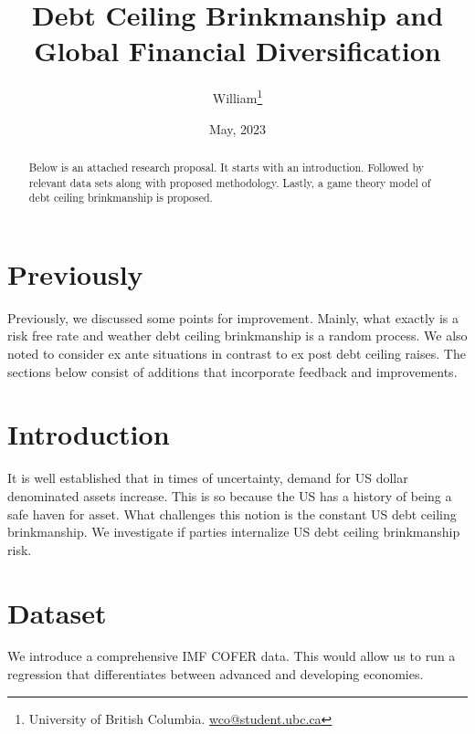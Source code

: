 \documentclass[12pt]{article}
\title{ \vspace*{-2.5cm} \hspace*{-0.5cm}Debt Ceiling Brinkmanship and Global Financial Diversification}
\author{William\thanks{University of British Columbia.
\href{mailto:TK@TK.edu}{wco@student.ubc.ca}}}
\date{ \vspace*{0.5cm} May, 2023\\
}
\begin{document}
\bgroup
\let\footnoterule\relax

\begin{singlespace}
\maketitle


\begin{abstract}
    \noindent Below is an attached research proposal. It starts with an introduction. Followed by relevant data sets along with proposed methodology. Lastly, a game theory model of debt ceiling brinkmanship is proposed. 
\end{abstract}
\end{singlespace}
\thispagestyle{empty}

\clearpage
\egroup
\setcounter{page}{1}


\section{Previously 
\label{sec:Previously}}
Previously, we discussed some points for improvement. Mainly, what exactly is a risk free rate and weather debt ceiling brinkmanship is a random process. We also noted to consider ex ante situations in contrast to ex post debt ceiling raises. The sections below consist of additions that incorporate feedback and improvements. 
\section{Introduction 
\label{sec:Introduction}}
It is well established that in times of uncertainty, demand for US dollar denominated assets increase. This is so because the US has a history of being a safe haven for asset. What challenges this notion is the constant US debt ceiling brinkmanship. We investigate if parties internalize US debt ceiling brinkmanship risk. 

\section{Dataset 
\label{sec:Dataset}}
We introduce a comprehensive IMF COFER data. 
This would allow us to run a regression that differentiates between advanced and developing economies. 
\end{document}
